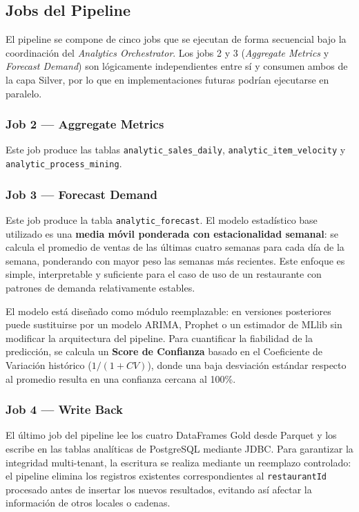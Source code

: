 \documentclass[12pt, letterpaper]{article}
\begin{document}
\subsection{Jobs del Pipeline}

El pipeline se compone de cinco jobs que se ejecutan de forma secuencial bajo la coordinación del \textit{Analytics Orchestrator}. Los jobs 2 y 3 (\textit{Aggregate Metrics} y \textit{Forecast Demand}) son lógicamente independientes entre sí y consumen ambos de la capa Silver, por lo que en implementaciones futuras podrían ejecutarse en paralelo.

\subsubsection{Job 2 — Aggregate Metrics}

Este job produce las tablas \texttt{analytic\_sales\_daily}, \texttt{analytic\_item\_velocity} y \texttt{analytic\_process\_mining}.



\subsubsection{Job 3 — Forecast Demand}

Este job produce la tabla \texttt{analytic\_forecast}. El modelo estadístico base utilizado es una \textbf{media móvil ponderada con estacionalidad semanal}: se calcula el promedio de ventas de las últimas cuatro semanas para cada día de la semana, ponderando con mayor peso las semanas más recientes. Este enfoque es simple, interpretable y suficiente para el caso de uso de un restaurante con patrones de demanda relativamente estables.

El modelo está diseñado como módulo reemplazable: en versiones posteriores puede sustituirse por un modelo ARIMA, Prophet o un estimador de MLlib sin modificar la arquitectura del pipeline. Para cuantificar la fiabilidad de la predicción, se calcula un \textbf{Score de Confianza} basado en el Coeficiente de Variación histórico ($1 / (1 + CV)$), donde una baja desviación estándar respecto al promedio resulta en una confianza cercana al 100\%.


\subsubsection{Job 4 — Write Back}

El último job del pipeline lee los cuatro DataFrames Gold desde Parquet y los escribe en las tablas analíticas de PostgreSQL mediante JDBC. Para garantizar la integridad multi-tenant, la escritura se realiza mediante un reemplazo controlado: el pipeline elimina los registros existentes correspondientes al \texttt{restaurantId} procesado antes de insertar los nuevos resultados, evitando así afectar la información de otros locales o cadenas.
\end{document}
